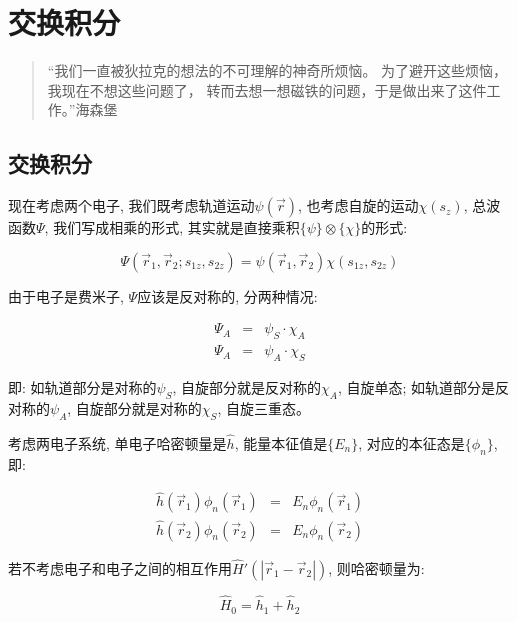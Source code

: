 \section{交换积分}

\begin{quotation}
``我们一直被狄拉克的想法的不可理解的神奇所烦恼。
为了避开这些烦恼，我现在不想这些问题了，
转而去想一想磁铁的问题，于是做出来了这件工作。''\qquad 海森堡
\end{quotation}

\subsection{交换积分}

现在考虑两个电子, 我们既考虑轨道运动$\psi(\vec r)$,
也考虑自旋的运动$\chi (s_z)$, 总波函数$\Psi$, 我们写成相乘的形式,
其实就是直接乘积$\{\psi\} \otimes \{\chi\}$的形式:


\begin{equation*}
    \Psi(\vec r_1, \vec r_2; s_{1z}, s_{2z}) = \psi(\vec r_1, \vec r_2) \chi(s_{1z}, s_{2z})
\end{equation*}


由于电子是费米子, $\Psi$应该是反对称的, 分两种情况:

\begin{eqnarray*}
  \Psi_A &=& \psi_S \cdot \chi_A \\
  \Psi_A &=& \psi_A \cdot \chi_S
\end{eqnarray*}

即: 如轨道部分是对称的$\psi_S$, 自旋部分就是反对称的$\chi_A$,
自旋单态; 如轨道部分是反对称的$\psi_A$, 自旋部分就是对称的$\chi_S$,
自旋三重态。

考虑两电子系统, 单电子哈密顿量是$\hat h$, 能量本征值是$\{E_n\}$,
对应的本征态是$\{\phi_n\}$, 即:

\begin{eqnarray*}
  \hat h(\vec r_1) \phi_n(\vec r_1) &=& E_n \phi_n(\vec r_1) \\
  \hat h(\vec r_2) \phi_n(\vec r_2) &=& E_n \phi_n(\vec r_2)
\end{eqnarray*}

若不考虑电子和电子之间的相互作用$\hat H'(|\vec r_1 - \vec r_2|)$,
则哈密顿量为:

\begin{equation*}
    \hat H_0 = \hat h_1 + \hat h_2
\end{equation*}

